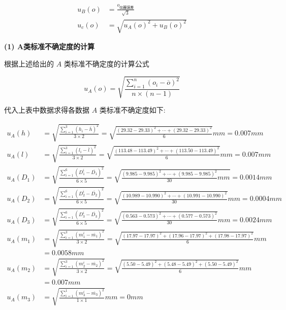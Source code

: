 \documentclass[UTF8]{ctexart}
\begin{document}
\begin{align*}
    u_B(o) &= \frac{o_{\text{仪器误差}}}{\sqrt{3}} \\
    u_c(o) &= \sqrt{u_A(o)^2+u_B(o)^2}
\end{align*}


\begin{spacing}{1.35}
\textbf{(1) A类标准不确定度的计算}


根据上述给出的 $A$ 类标准不确定度的计算公式
\end{spacing}

$$u_A(o) = \sqrt{\frac{\sum_{i=1}^n (o_i - \overline{o})^2}{n\times (n-1)}}$$

代入上表中数据求得各数据 $A$ 类标准不确定度如下:

   \begin{align*}
      u_{A}(h)  &= \sqrt{\frac{\sum_{i=1}^{3}(h_i-\overline{h})^2}{3\times 2}} =  \sqrt{\frac{(29.32-29.33)^2 +\cdots + (29.32-29.33)^2}{6}} mm  = 0.007mm
      \\
      u_A(l)  &= \sqrt{\frac{\sum_{i=1}^{3}(l_i-\overline{l})^2}{3\times 2}} = 
      \sqrt{\frac{(113.48-113.49)^2 + \cdots + (113.50-113.49)^2}{6}} mm = 0.007 mm
      \\
      u_A(D_1) &= \sqrt{\frac{\sum_{i=1}^{6}(D_1^i-\overline{D_1})^2}{6\times 5}} = \sqrt{\frac{(9.985-9.985)^2 + \cdots + (9.985-9.985)^2}{30}mm} = 0.0014mm\\
      u_A(D_2) &= \sqrt{\frac{\sum_{i=1}^{6}(D_2^i-\overline{D_2})^2}{6\times 5}}  = \sqrt{\frac{(10.989 - 10.990)^2+ \cdots + (10.991-10.990)^2}{30}} mm = 0.0004mm
      \\
      u_A(D_3) &= \sqrt{\frac{\sum_{i=1}^{6}(D_3^i-\overline{D_3})^2}{6\times 5}}  = \sqrt{\frac{(0.563-0.573)^2 + \cdots + (0.577-0.573)^2}{30}}mm = 0.0024mm\\
      u_A(m_1) & = \sqrt{\frac{\sum_{i=1}^{3}(m_1^i-\overline{m_1})^2}{3\times 2}}  = \sqrt{\frac{(17.97-17.97)^2 + (17.96-17.97)^2 + (17.98-17.97)^2}{6}}mm  \\ &= 0.0058mm\\
      u_A(m_2) & = \sqrt{\frac{\sum_{i=1}^{3}(m_2^i-\overline{m_2})^2}{3\times 2} } = \sqrt{\frac{(5.50-5.49)^2 + (5.48-5.49)^2 + (5.50-5.49)^2}{6}} mm  \\ &= 0.007  mm\\
      u_A(m_3) & = \sqrt{\frac{\sum_{i=1}^{1}(m_3^i-\overline{m_3})^2}{1\times 1}} mm = 0 mm\\
   \end{align*}

   
\newpage
\end{document}
